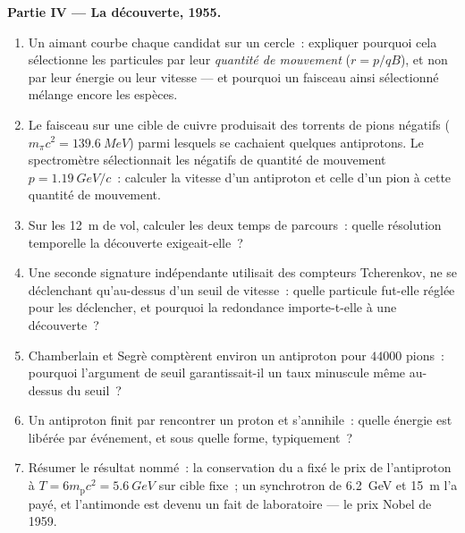 \begin{problem}
\medskip\noindent\textbf{Partie IV --- La découverte, 1955.}
\begin{enumerate}[resume]
  \item Un aimant courbe chaque candidat sur un cercle~: expliquer
        pourquoi cela sélectionne les particules par leur
        \emph{quantité de mouvement} ($r = p/qB$), et non par leur
        énergie ou leur vitesse --- et pourquoi un faisceau ainsi
        sélectionné mélange encore les espèces.
  \item Le faisceau sur une cible de cuivre produisait des torrents de
        pions négatifs ($m_\pi c^2 = \qty{139.6}{MeV}$) parmi lesquels
        se cachaient quelques antiprotons. Le spectromètre sélectionnait
        les négatifs de quantité de mouvement $p = \qty{1.19}{GeV}/c$~:
        calculer la vitesse d'un antiproton et celle d'un pion à cette
        quantité de mouvement.
  \item Sur les \qty{12}{m} de vol, calculer les deux temps de
        parcours~: quelle résolution temporelle la découverte
        exigeait-elle~?
  \item Une seconde signature indépendante utilisait des compteurs
        Tcherenkov, ne se déclenchant qu'au-dessus d'un seuil de
        vitesse~: quelle particule fut-elle réglée pour les
        déclencher, et pourquoi la redondance importe-t-elle à une
        découverte~?
  \item Chamberlain et Segrè comptèrent environ un antiproton pour
        $\num{44000}$ pions~: pourquoi l'argument de seuil
        garantissait-il un taux minuscule même au-dessus du seuil~?
  \item Un antiproton finit par rencontrer un proton et s'annihile~:
        quelle énergie est libérée par événement, et sous quelle forme,
        typiquement~?
  \item Résumer le résultat nommé~: la conservation du  a fixé le prix de l'antiproton à $T = 6m_{\text{p}}c^2 =
        \qty{5.6}{GeV}$ sur cible fixe~; un synchrotron de
        \qty{6.2}{GeV} et \qty{15}{m} l'a payé, et l'antimonde est
        devenu un fait de laboratoire --- le prix Nobel de 1959.
\end{enumerate}
\end{problem}
